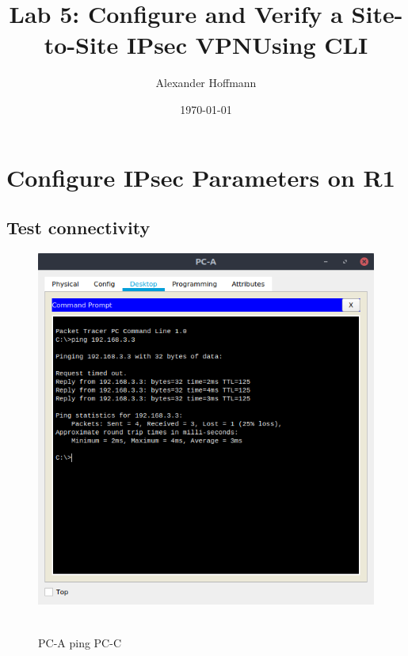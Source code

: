 \documentclass[12pt]{extarticle}
\title{Lab 5: Configure and Verify a Site-to-Site IPsec VPNUsing CLI}
\author{Alexander Hoffmann}
\date{\today}
\begin{document}
\maketitle

\section{Configure IPsec Parameters on R1}
\subsection{Test connectivity}
\begin{center}
\begin{figure}[H]
\includegraphics[scale=0.7]{resources/q01a.png}\
\caption{PC-A ping PC-C}
\end{figure}
\end{center}
\end{document}
